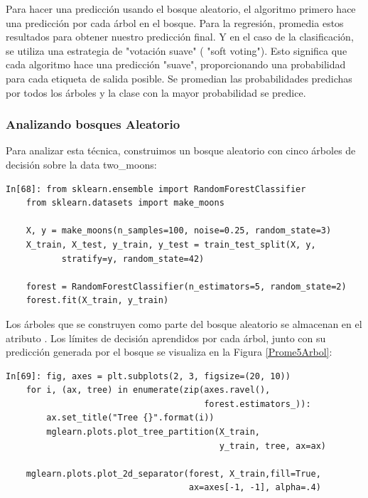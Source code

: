 { 
Para hacer una predicción usando el bosque aleatorio, el algoritmo primero hace una predicción
por cada árbol en el bosque.  Para la  regresión,  promedia  estos resultados para obtener nuestro predicción final.  Y en el caso de la clasificación, se utiliza una estrategia de "{}votación suave"{} ( "{}soft voting"{}). Esto significa que cada algoritmo hace una predicción "{}suave"{}, proporcionando una probabilidad para cada etiqueta de salida posible. Se promedian las probabilidades predichas por todos los árboles y la clase con la mayor probabilidad  se predice.

\subsubsection{Analizando bosques Aleatorio} 

Para analizar esta técnica, construimos un bosque aleatorio con cinco árboles de decisión sobre la data  {\ttfamily two\_moons}:\\



\begin{lstlisting}
In[68]: from sklearn.ensemble import RandomForestClassifier
	from sklearn.datasets import make_moons
	
	X, y = make_moons(n_samples=100, noise=0.25, random_state=3)
	X_train, X_test, y_train, y_test = train_test_split(X, y, 
	       stratify=y, random_state=42)
	       
	forest = RandomForestClassifier(n_estimators=5, random_state=2)
	forest.fit(X_train, y_train)
\end{lstlisting}

Los árboles que se construyen como parte del bosque aleatorio se almacenan en el atributo {}.  Los límites de decisión aprendidos por cada árbol, junto con su predicción  generada por el bosque se visualiza en la Figura \ref{Prome5Arbol}:\\


\begin{lstlisting}
In[69]: fig, axes = plt.subplots(2, 3, figsize=(20, 10))
	for i, (ax, tree) in enumerate(zip(axes.ravel(), 
	                                   forest.estimators_)):
        ax.set_title("Tree {}".format(i))
        mglearn.plots.plot_tree_partition(X_train,
    	                                  y_train, tree, ax=ax)
    	
	mglearn.plots.plot_2d_separator(forest, X_train,fill=True,
	                                ax=axes[-1, -1], alpha=.4)
	                                

\end{lstlisting}}
